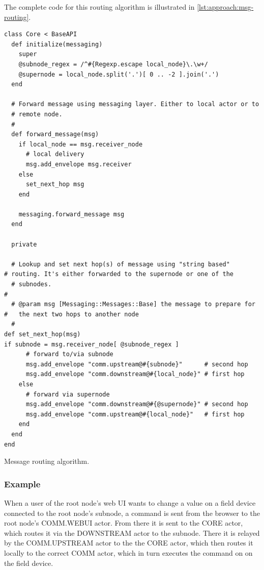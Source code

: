  The complete code for this routing algorithm is illustrated in
 \autoref{lst:approach:msg-routing}.


\begin{listing}[H]
	\begin{verbatim}
class Core < BaseAPI
  def initialize(messaging)
    super
    @subnode_regex = /^#{Regexp.escape local_node}\.\w+/
    @supernode = local_node.split('.')[ 0 .. -2 ].join('.')
  end

  # Forward message using messaging layer. Either to local actor or to
  # remote node.
  #
  def forward_message(msg)
    if local_node == msg.receiver_node
      # local delivery
      msg.add_envelope msg.receiver
    else
      set_next_hop msg
    end

    messaging.forward_message msg
  end

  private

  # Lookup and set next hop(s) of message using "string based"                                                                                                             # routing. It's either forwarded to the supernode or one of the
  # subnodes.                                                                                                                                                              #
  # @param msg [Messaging::Messages::Base] the message to prepare for                                                                                                      #   the next two hops to another node
  #                                                                                                                                                                        def set_next_hop(msg)                                                                                                                                                      if subnode = msg.receiver_node[ @subnode_regex ]
      # forward to/via subnode
      msg.add_envelope "comm.upstream@#{subnode}"      # second hop
      msg.add_envelope "comm.downstream@#{local_node}" # first hop
    else
      # forward via supernode
      msg.add_envelope "comm.downstream@#{@supernode}" # second hop
      msg.add_envelope "comm.upstream@#{local_node}"   # first hop
    end
  end
end
	\end{verbatim}
	\caption{Message routing algorithm.}
	\label{lst:approach:msg-routing}
\end{listing}


\subsubsection{Example}
When a user of the root node's web UI wants to change a value on a field device
connected to the root node's subnode, a command is sent from the browser to the
root node's COMM.WEBUI actor. From there it is sent to the CORE actor, which
routes it via the DOWNSTREAM actor to the subnode. There it is relayed by the
COMM.UPSTREAM actor to the the CORE actor, which then routes it locally to the
correct COMM actor, which in turn executes the command on on the field device.

